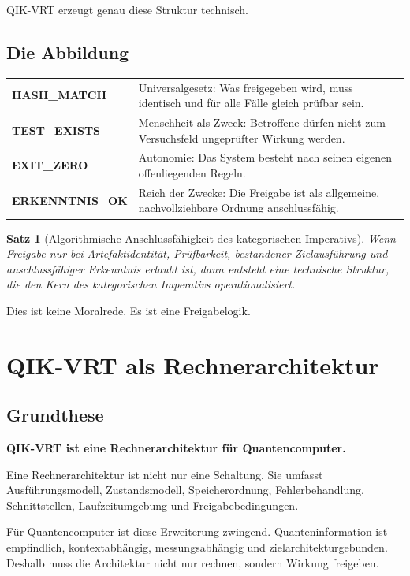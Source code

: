 \documentclass[11pt,a4paper,oneside]{book}
\newtheorem{satz}{Satz}[chapter]
\begin{document}
QIK-VRT erzeugt genau diese Struktur technisch.

\section{Die Abbildung}

\begin{longtable}{>{\bfseries}p{}p{}}
\toprule
HASH\_MATCH & Universalgesetz: Was freigegeben wird, muss identisch und für alle Fälle gleich prüfbar sein. \\
TEST\_EXISTS & Menschheit als Zweck: Betroffene dürfen nicht zum Versuchsfeld ungeprüfter Wirkung werden. \\
EXIT\_ZERO & Autonomie: Das System besteht nach seinen eigenen offenliegenden Regeln. \\
ERKENNTNIS\_OK & Reich der Zwecke: Die Freigabe ist als allgemeine, nachvollziehbare Ordnung anschlussfähig. \\
\bottomrule
\end{longtable}

\begin{satz}[Algorithmische Anschlussfähigkeit des kategorischen Imperativs]
Wenn Freigabe nur bei Artefaktidentität, Prüfbarkeit, bestandener Zielausführung und anschlussfähiger Erkenntnis erlaubt ist, dann entsteht eine technische Struktur, die den Kern des kategorischen Imperativs operationalisiert.
\end{satz}

Dies ist keine Moralrede. Es ist eine Freigabelogik.

\chapter{QIK-VRT als Rechnerarchitektur}

\section{Grundthese}

\begin{merkbox}
\centering
\textbf{QIK-VRT ist eine Rechnerarchitektur für Quantencomputer.}
\end{merkbox}

Eine Rechnerarchitektur ist nicht nur eine Schaltung. Sie umfasst Ausführungsmodell, Zustandsmodell, Speicherordnung, Fehlerbehandlung, Schnittstellen, Laufzeitumgebung und Freigabebedingungen.

Für Quantencomputer ist diese Erweiterung zwingend. Quanteninformation ist empfindlich, kontextabhängig, messungsabhängig und zielarchitekturgebunden. Deshalb muss die Architektur nicht nur rechnen, sondern Wirkung freigeben.
\end{document}
